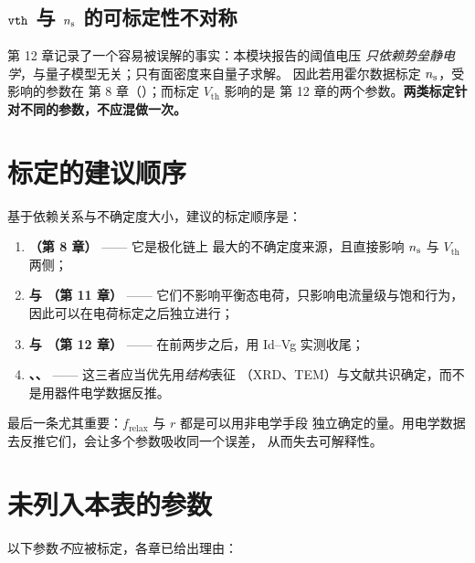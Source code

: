 \subsection*{$\akey{vth}$ 与 $n_{\mathrm{s}}$ 的可标定性不对称}

第 12 章记录了一个容易被误解的事实：本模块报告的阈值电压
\emph{只依赖势垒静电学}，与量子模型无关；只有面密度来自量子求解。
因此若用霍尔数据标定 $n_{\mathrm{s}}$，受影响的参数在
第 8 章（）；而标定 $V_{\text{th}}$ 影响的是
第 12 章的两个参数。\textbf{两类标定针对不同的参数，不应混做一次。}

\section{标定的建议顺序}

基于依赖关系与不确定度大小，建议的标定顺序是：

\begin{enumerate}[leftmargin=1.9em,itemsep=0.4em,topsep=0.4em]
  \item \textbf{（第 8 章）} —— 它是极化链上
        最大的不确定度来源，且直接影响 $n_{\mathrm{s}}$ 与 $V_{\text{th}}$ 两侧；
  \item \textbf{ 与 （第 11 章）} ——
        它们不影响平衡态电荷，只影响电流量级与饱和行为，
        因此可以在电荷标定之后独立进行；
  \item \textbf{ 与 
        （第 12 章）} —— 在前两步之后，用 Id--Vg 实测收尾；
  \item \textbf{、、
        } —— 这三者应当优先用\emph{结构}表征
        （XRD、TEM）与文献共识确定，而不是用器件电学数据反推。
\end{enumerate}

最后一条尤其重要：$f_{\text{relax}}$ 与 $r$ 都是可以用非电学手段
独立确定的量。用电学数据去反推它们，会让多个参数吸收同一个误差，
从而失去可解释性。

\section{未列入本表的参数}

以下参数\emph{不}应被标定，各章已给出理由：

